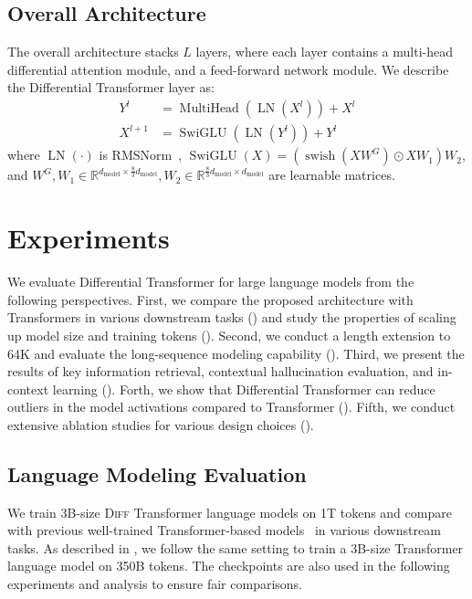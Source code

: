 \documentclass{article}
\newcommand\our{Differential Transformer}
\newcommand\ourtrm{Differential Transformer}
\newcommand\diff{\textsc{Diff} Transformer}
\newcommand\trm{Transformer}
\begin{document}
\subsection{Overall Architecture}
The overall architecture stacks $L$ layers, where each layer contains a multi-head differential attention module, and a feed-forward network module.
We describe the \ourtrm{} layer as:
\begin{align}
Y^l &= \operatorname{MultiHead}(\operatorname{LN}(X^l)) + X^l \label{eq:attn} \\
X^{l+1} &= \operatorname{SwiGLU}(\operatorname{LN}(Y^l)) + Y^l \label{eq:ffn}
\end{align}
where $\operatorname{LN}(\cdot)$ is RMSNorm~\citep{rmsnorm}, $\operatorname{SwiGLU}(X) = (\operatorname{swish}(X W^G)\odot X W_1)W_2$, and $W^G, W_1 \in \mathbb{R}^{d_{\text{model}} \times \frac{8}{3} d_{\text{model}}}, W_2 \in \mathbb{R}^{\frac{8}{3} d_{\text{model}} \times d_{\text{model}}}$ are learnable matrices.


\section{Experiments}
\label{sec:exp}

We evaluate \our{} for large language models from the following perspectives.
First, we compare the proposed architecture with Transformers in various downstream tasks () and study the properties of scaling up model size and training tokens ().
Second, we conduct a length extension to 64K and evaluate the long-sequence modeling capability ().
Third, we present the results of key information retrieval, contextual hallucination evaluation, and in-context learning ().
Forth, we show that \our{} can reduce outliers in the model activations compared to Transformer ().
Fifth, we conduct extensive ablation studies for various design choices ().


\subsection{Language Modeling Evaluation}
\label{sec:lm:3b}

We train 3B-size \diff{} language models on 1T tokens and compare with previous well-trained Transformer-based models~\citep{openllama,stablelm-alphav2,stablelm} in various downstream tasks.
As described in , we follow the same setting to train a 3B-size \trm{} language model on 350B tokens.
The checkpoints are also used in the following experiments and analysis to ensure fair comparisons.
\end{document}
